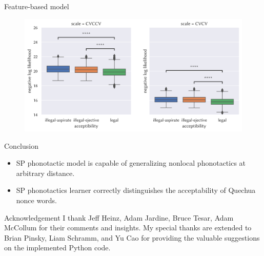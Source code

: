 \begin{frame}{Feature-based model}
    \begin{figure}[h]
        \centering
        \includegraphics[width=\textwidth]{fig/fig:plot-feat-box.png}
    \end{figure}
\end{frame}




\begin{frame}{Conclusion}
    \begin{itemize}
    \item SP phonotactic model is capable of generalizing nonlocal phonotactics at arbitrary distance.
    \item SP phonotactics learner correctly distinguishes the acceptability of Quechua nonce words.

    \end{itemize}
    
\end{frame}

\begin{frame}{Acknowledgement}
 I thank Jeff Heinz, Adam Jardine, Bruce Tesar, Adam McCollum for their comments and insights. My special thanks are extended to Brian Pinsky, Liam Schramm, and Yu Cao for providing the valuable suggestions on the implemented Python code.

\vspace{0.5cm}
\begin{figure}[h]
    \centering
{}
\end{figure}
\end{frame}

